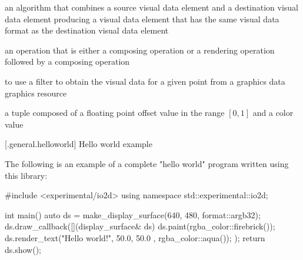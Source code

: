 an algorithm that combines a source visual data element and a destination visual data element producing a visual data element that has the same visual data format as the destination visual data element

an operation that is either a composing operation or a rendering operation followed by a composing operation

to use a filter to obtain the visual data for a given point from a graphics data graphics resource

a tuple composed of a floating point offset value in the range $[0, 1]$ and a color value



%
%

 [\iotwod.general.helloworld] {Hello world example}

\pnum
The following is an example of a complete "hello world" program written using this library:

\begin{codeblock}
#include <experimental/io2d>
using namespace std::experimental::io2d;

int main() {
  auto ds = make_display_surface(640, 480, format::argb32);
  ds.draw_callback([](display_surface& ds) {
    ds.paint(rgba_color::firebrick());
    ds.render_text("Hello world!", { 50.0, 50.0 }, rgba_color::aqua());
  });
  return ds.show();
}
\end{codeblock}
